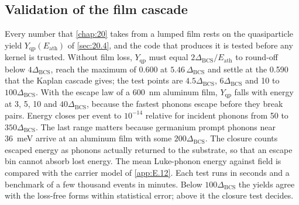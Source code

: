 \subsection{Validation of the film cascade}\label{app:E.25-film}

Every number that \cref{chap:20} takes from a lumped film rests on the quasiparticle yield $Y_{\mathrm{qp}}(E_{\mathrm{ath}})$ of \cref{sec:20.4}, and the code that produces it is tested before any kernel is trusted. Without film loss, $Y_{\mathrm{qp}}$ must equal $2\Delta_{\mathrm{BCS}}/E_{\mathrm{ath}}$ to round-off below $4\Delta_{\mathrm{BCS}}$, reach the maximum of 0.600 at $5.46\,\Delta_{\mathrm{BCS}}$ and settle at the 0.590 that the Kaplan cascade gives; the test points are $4.5\Delta_{\mathrm{BCS}}$, $6\Delta_{\mathrm{BCS}}$ and 10 to $100\Delta_{\mathrm{BCS}}$. With the escape law of a \SI{600}{nm} aluminum film, $Y_{\mathrm{qp}}$ falls with energy at 3, 5, 10 and $40\Delta_{\mathrm{BCS}}$, because the fastest phonons escape before they break pairs. Energy closes per event to $10^{-14}$ relative for incident phonons from 50 to $350\Delta_{\mathrm{BCS}}$. The last range matters because germanium prompt phonons near \SI{36}{meV} arrive at an aluminum film with some $200\Delta_{\mathrm{BCS}}$. The closure counts escaped energy as phonons actually returned to the substrate, so that an escape bin cannot absorb lost energy. The mean Luke-phonon energy against field is compared with the carrier model of \cref{app:E.12}. Each test runs in seconds and a benchmark of a few thousand events in minutes. Below $100\Delta_{\mathrm{BCS}}$ the yields agree with the loss-free forms within statistical error; above it the closure test decides.

